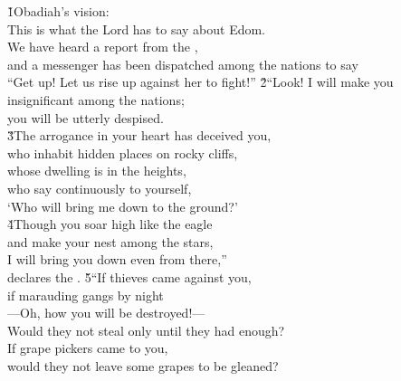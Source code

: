 


\begin{poetry}
\poeml \v{1}Obadiah's vision: \\
\poeml This is what the Lord  has to say about Edom. \\
\poeml We have heard a report from the , \\
\poemll    and a messenger has been dispatched among the nations to say \\
\poeml ``Get up! Let us rise up against her to fight!''
\poeml \v{2}``Look! I will make you insignificant among the nations; \\
\poemll    you will be utterly despised. \\
\poeml \v{3}The arrogance in your heart has deceived you, \\
\poemll    who inhabit hidden places on rocky cliffs, \\
\poemll    whose dwelling is in the heights, \\
\poemll    who say continuously to yourself, \\
\poemlll       `Who will bring me down to the ground?' \\
\poeml \v{4}Though you soar high like the eagle \\
\poemll    and make your nest among the stars, \\
\poeml I will bring you down even from there,'' \\
\poemlll       declares the .
\poeml \v{5}``If thieves came against you, \\
\poemll    if marauding gangs by night \\
\poemlll       ---Oh, how you will be destroyed!--- \\
\poeml Would they not steal only until they had enough? \\
\poeml If grape pickers came to you, \\
\poemll    would they not leave some grapes to be gleaned? \\

\end{poetry}
